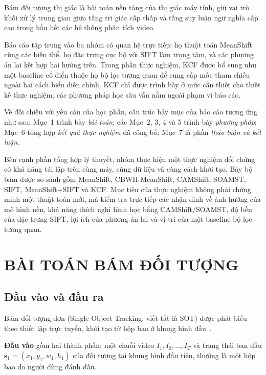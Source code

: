 \documentclass[12pt,a4paper]{article}
\numberwithin{equation}{section}
\begin{document}
Bám đối tượng thị giác là bài toán nền tảng của thị giác máy tính, giữ vai trò khối xử lý trung
gian giữa tầng tri giác cấp thấp và tầng suy luận ngữ nghĩa cấp cao trong hầu hết các hệ thống
phân tích video.

Báo cáo tập trung vào ba nhóm có quan hệ trực tiếp: họ thuật toán MeanShift cùng các biến thể,
họ đặc trưng cục bộ với SIFT làm trọng tâm, và các phương án lai kết hợp hai hướng trên. Trong phần
thực nghiệm, KCF được bổ sung như một baseline cổ điển thuộc họ bộ lọc tương quan để cung cấp mốc
tham chiếu ngoài hai cách biểu diễn chính. KCF chỉ được trình bày ở mức cần thiết cho thiết kế thực
nghiệm; các phương pháp học sâu vẫn nằm ngoài phạm vi báo cáo.

Về đối chiếu với yêu cầu của học phần, cấu trúc bảy mục của báo cáo tương ứng như sau: Mục~1 trình
bày \textit{bài toán}; các Mục~2, 3, 4 và 5 trình bày \textit{phương pháp}; Mục~6 tổng hợp
\textit{kết quả thực nghiệm} đã công bố; Mục~7 là phần \textit{thảo luận và kết luận}.

Bên cạnh phần tổng hợp lý thuyết, nhóm thực hiện một thực nghiệm đối chứng có khả năng tái lập trên
cùng máy, cùng dữ liệu và cùng cách khởi tạo. Bảy bộ bám được so sánh gồm MeanShift,
CBWH-MeanShift, CAMShift, SOAMST, SIFT, MeanShift+SIFT và KCF. Mục tiêu của thực nghiệm không phải
chứng minh một thuật toán mới, mà kiểm tra trực tiếp các nhận định về ảnh hưởng của mô hình nền,
khả năng thích nghi hình học bằng CAMShift/SOAMST, độ bền của đặc trưng SIFT, lợi ích của phương án
lai và vị trí của một baseline bộ lọc tương quan.
\clearpage

\setcounter{page}{1}

\section{BÀI TOÁN BÁM ĐỐI TƯỢNG}

\subsection{Đầu vào và đầu ra}

Bám đối tượng đơn (Single Object Tracking, viết tắt là SOT) được phát biểu theo thiết lập trực tuyến, khởi tạo từ hộp bao ở khung hình đầu~\cite{smeulders2014}.

\textbf{Đầu vào} gồm hai thành phần: một chuỗi video $I_1, I_2, \dots, I_T$ và trạng thái ban đầu
$\mathbf{s}_1 = (x_1, y_1, w_1, h_1)$ của đối tượng tại khung hình đầu tiên, thường là một hộp bao
do người dùng đánh dấu.
\end{document}
